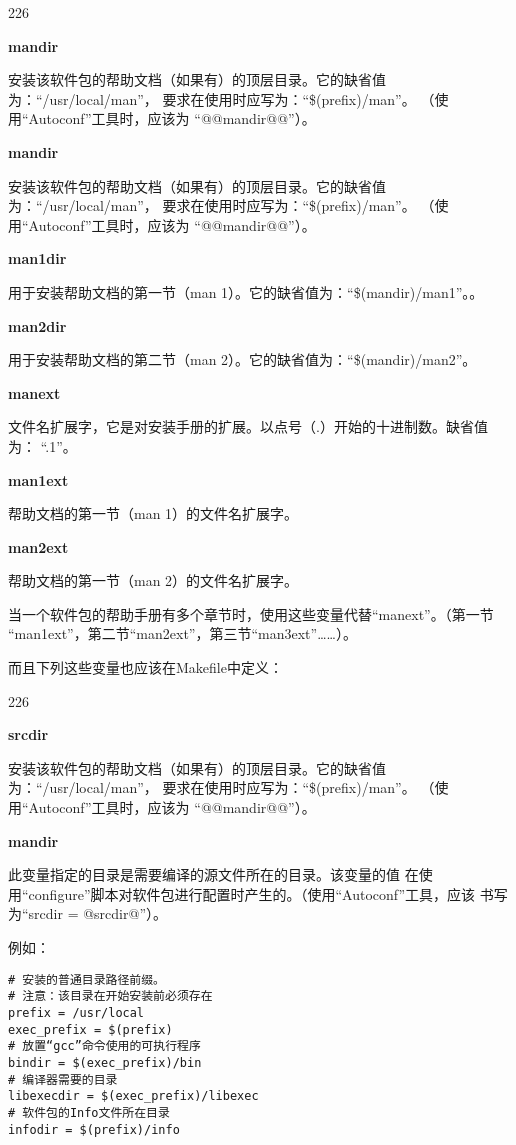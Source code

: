 \begin{dinglist}{226}
\itemsep=4pt \parskip=0pt

\item \textbf{mandir}

安装该软件包的帮助文档（如果有）的顶层目录。它的缺省值为：“/usr/local/man”，
要求在使用时应写为：“\$(prefix)/man”。 （使用“Autoconf”工具时，应该为
“@@mandir@@”）。

\item \textbf{mandir}

安装该软件包的帮助文档（如果有）的顶层目录。它的缺省值为：“/usr/local/man”，
要求在使用时应写为：“\$(prefix)/man”。 （使用“Autoconf”工具时，应该为
“@@mandir@@”）。

\item \textbf{man1dir}

用于安装帮助文档的第一节（man 1）。它的缺省值为：“\$(mandir)/man1”。。

\item \textbf{man2dir}

用于安装帮助文档的第二节（man 2）。它的缺省值为：“\$(mandir)/man2”。

\item \textbf{manext}

文件名扩展字，它是对安装手册的扩展。以点号（.）开始的十进制数。缺省值为：
“.1”。

\item \textbf{man1ext}

帮助文档的第一节（man 1）的文件名扩展字。

\item \textbf{man2ext}

帮助文档的第一节（man 2）的文件名扩展字。

当一个软件包的帮助手册有多个章节时，使用这些变量代替“manext”。（第一节
“man1ext”，第二节“man2ext”，第三节“man3ext”……）。
\end{dinglist}

而且下列这些变量也应该在Makefile中定义：

\begin{dinglist}{226}
\itemsep=4pt \parskip=0pt

\item \textbf{srcdir}

安装该软件包的帮助文档（如果有）的顶层目录。它的缺省值为：“/usr/local/man”，
要求在使用时应写为：“\$(prefix)/man”。 （使用“Autoconf”工具时，应该为
“@@mandir@@”）。

\item \textbf{mandir}

此变量指定的目录是需要编译的源文件所在的目录。该变量的值
    在使用“configure”脚本对软件包进行配置时产生的。（使用“Autoconf”工具，应该
    书写为“srcdir = @srcdir@”）。

例如：
\begin{Verbatim}[]
# 安装的普通目录路径前缀。
# 注意：该目录在开始安装前必须存在
prefix = /usr/local
exec_prefix = $(prefix)
# 放置“gcc”命令使用的可执行程序
bindir = $(exec_prefix)/bin
# 编译器需要的目录
libexecdir = $(exec_prefix)/libexec
# 软件包的Info文件所在目录
infodir = $(prefix)/info
\end{Verbatim}

\end{dinglist}

